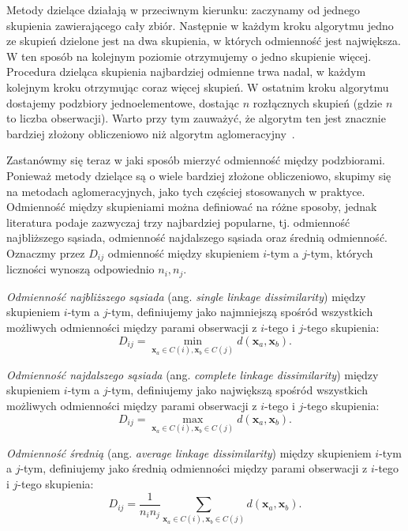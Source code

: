 \documentclass{praca1}
\begin{document}
Metody dzielące działają w przeciwnym kierunku: zaczynamy od jednego skupienia zawierającego cały zbiór. Następnie w każdym kroku algorytmu jedno ze skupień dzielone jest na dwa skupienia, w których odmienność jest największa. W ten sposób na kolejnym poziomie otrzymujemy o jedno skupienie więcej. Procedura dzieląca skupienia najbardziej odmienne trwa nadal, w każdym kolejnym kroku otrzymując coraz więcej skupień. W ostatnim kroku algorytmu dostajemy podzbiory jednoelementowe, dostając $n$ rozłącznych skupień (gdzie $n$ to liczba obserwacji). Warto przy tym zauważyć, że algorytm ten jest znacznie bardziej złożony obliczeniowo niż algorytm aglomeracyjny~\cite{Hastie2009:elements, Koronacki2005:statystyczne}.

Zastanówmy się teraz w jaki sposób mierzyć odmienność między podzbiorami. Ponieważ metody dzielące są o wiele bardziej złożone obliczeniowo, skupimy się na metodach aglomeracyjnych, jako tych częściej stosowanych w praktyce. Odmienność między skupieniami można definiować na różne sposoby, jednak literatura podaje zazwyczaj trzy najbardziej popularne, tj. odmienność najbliższego sąsiada, odmienność najdalszego sąsiada oraz średnią odmienność. Oznaczmy przez $D_{ij}$ odmienność między skupieniem $i$-tym a $j$-tym, których liczności wynoszą odpowiednio $n_i, n_j$\cite{Hastie2009:elements, Koronacki2005:statystyczne}.

\begin{definition}
\emph{Odmienność najbliższego sąsiada} (ang. \emph{single linkage dissimilarity}) między skupieniem $i$-tym a $j$-tym, definiujemy jako najmniejszą spośród wszystkich możliwych odmienności między parami obserwacji z $i$-tego i $j$-tego skupienia:
$$
D_{ij} = \min\limits_{\mathbf{x}_a \in C(i), \mathbf{x}_b \in C(j)}d(\mathbf{x}_a, \mathbf{x}_b).
$$
\end{definition}

\begin{definition}
\emph{Odmienność najdalszego sąsiada} (ang. \emph{complete linkage dissimilarity}) między skupieniem $i$-tym a $j$-tym, definiujemy jako największą spośród wszystkich możliwych odmienności między parami obserwacji z $i$-tego i $j$-tego skupienia:
$$
D_{ij} = \max\limits_{\mathbf{x}_a \in C(i), \mathbf{x}_b \in C(j)}d(\mathbf{x}_a, \mathbf{x}_b).
$$
\end{definition}

\begin{definition}
\emph{Odmienność średnią} (ang. \emph{average linkage dissimilarity}) między skupieniem $i$-tym a $j$-tym, definiujemy jako średnią odmienności między parami obserwacji z $i$-tego i $j$-tego skupienia:
$$
D_{ij} = \frac{1}{n_i n_j}\sum\limits_{\mathbf{x}_a \in C(i), \mathbf{x}_b \in C(j)}d(\mathbf{x}_a, \mathbf{x}_b).
$$
\end{definition}
\end{document}
